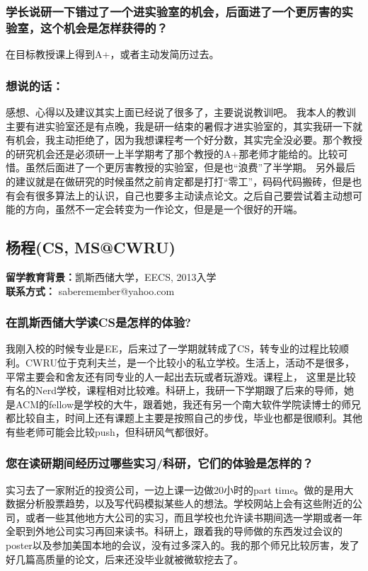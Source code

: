 \documentclass[a4paper,UTF8]{book}
\begin{document}
    \subsubsection{学长说研一下错过了一个进实验室的机会，后面进了一个更厉害的实验室，这个机会是怎样获得的？}
    在目标教授课上得到A+，或者主动发简历过去。

    \subsubsection{想说的话：}
    感想、心得以及建议其实上面已经说了很多了，主要说说教训吧。
    我本人的教训主要有进实验室还是有点晚，我是研一结束的暑假才进实验室的，其实我研一下就有机会，我主动拒绝了，因为我想课程考一个好分数，其实完全没必要。那个教授的研究机会还是必须研一上半学期考了那个教授的A+那老师才能给的。比较可惜。虽然后面进了一个更厉害教授的实验室，但是也“浪费”了半学期。
    另外最后的建议就是在做研究的时候虽然之前肯定都是打打“零工”，码码代码搬砖，但是也有会有很多算法上的认识，自己也要多主动读点论文。之后自己要尝试着主动想可能的方向，虽然不一定会转变为一作论文，但是是一个很好的开端。
     

\clearpage
\subsection{杨程(CS, MS@CWRU)}
    \textbf{留学教育背景：}凯斯西储大学，EECS, 2013入学\\
    \textbf{联系方式：} saberemember@yahoo.com

    \subsubsection*{在凯斯西储大学读CS是怎样的体验?}
    我刚入校的时候专业是EE，后来过了一学期就转成了CS，转专业的过程比较顺利。CWRU位于克利夫兰，是一个比较小的私立学校。生活上，活动不是很多，平常主要会和舍友还有同专业的人一起出去玩或者玩游戏。课程上， 这里是比较有名的Nerd学校，课程相对比较难。科研上，我研一下学期跟了后来的导师，她是ACM的fellow是学校的大牛，跟着她，我还有另一个南大软件学院读博士的师兄都比较自主，时间上还有课题上主要是按照自己的步伐，毕业也都是很顺利。其他有些老师可能会比较push，但科研风气都很好。
    
    \subsubsection*{您在读研期间经历过哪些实习/科研，它们的体验是怎样的？}
    实习去了一家附近的投资公司，一边上课一边做20小时的part time。做的是用大数据分析股票趋势，以及写代码模拟某些人的想法。学校网站上会有这些附近的公司，或者一些其他地方大公司的实习，而且学校也允许读书期间选一学期或者一年全职到外地公司实习再回来读书。科研上，跟着我的导师做的东西发过会议的poster以及参加美国本地的会议，没有过多深入的。我的那个师兄比较厉害，发了好几篇高质量的论文，后来还没毕业就被微软挖去了。
    
\end{document}
